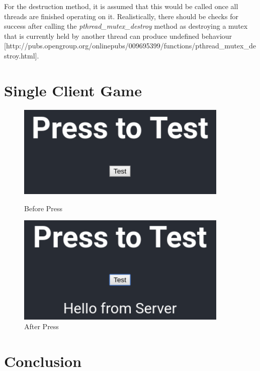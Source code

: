 \documentclass[12pt]{article}
\begin{document}
For the destruction method, it is assumed that this would be called once all threads are finished operating on it. Realistically, there should be checks for success after calling the \emph{pthread_mutex_destroy} method as destroying a mutex that is currently held by another thread can produce undefined behaviour [http://pubs.opengroup.org/onlinepubs/009695399/functions/pthread_mutex_destroy.html].

\part{Single Client Game}

\begin{figure}[!ht]
    \centering
    \begin{minipage}{0.45\textwidth}
        \centering
        \includegraphics[width=0.9\textwidth]{images/part1pretest} %
        \caption{Before Press}
        \label{fig:beforepress}
    \end{minipage}\hfill
    \begin{minipage}{0.45\textwidth}
        \centering
        \includegraphics[width=0.9\textwidth]{images/part1posttest} %
        \caption{After Press}
        \label{fig:afterpress}
    \end{minipage}
\end{figure}

\part*{Conclusion}



\end{document}
